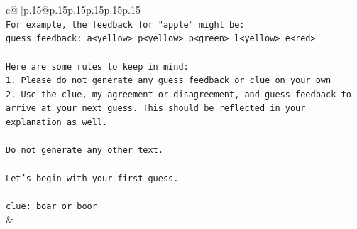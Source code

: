 \documentclass{article}
\begin{document}
{\begin{supertabular}{c@{$\;$}|p{.15\linewidth}@{}p{.15\linewidth}p{.15\linewidth}p{.15\linewidth}p{.15\linewidth}p{.15\linewidth}}
{{{\\ 
\texttt{For example, the feedback for "apple" might be:} \\
\texttt{guess\_feedback: a<yellow> p<yellow> p<green> l<yellow> e<red>} \\
\\ 
\texttt{Here are some rules to keep in mind:} \\
\texttt{1. Please do not generate any guess feedback or clue on your own} \\
\texttt{2. Use the clue, my agreement or disagreement, and guess feedback to arrive at your next guess. This should be reflected in your explanation as well.} \\
\\ 
\texttt{Do not generate any other text.} \\
\\ 
\texttt{Let's begin with your first guess.} \\
\\ 
\texttt{clue: boar or boor} \\
            }
        }
    }
    & \\ \\


\end{supertabular}}
\end{document}
